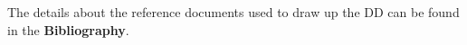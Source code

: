 The details about the reference documents used to draw up the DD can be found in the \textbf{Bibliography}.